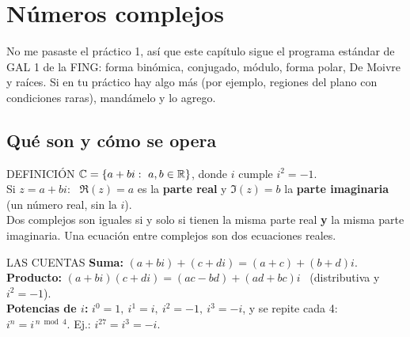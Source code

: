 \chapter{Números complejos}
\nuevo
\begin{falta}
No me pasaste el práctico 1, así que este capítulo sigue el programa estándar de GAL 1 de la FING: forma binómica, conjugado, módulo, forma polar, De Moivre y raíces. Si en tu práctico hay algo más (por ejemplo, regiones del plano con condiciones raras), mandámelo y lo agrego.
\end{falta}

\section{Qué son y cómo se opera}
\begin{sello}{DEFINICIÓN}
$\C=\{a+bi:\ a,b\in\R\}$, donde $i$ cumple $i^2=-1$.\\[2pt]
Si $z=a+bi$: \ $\Re(z)=a$ es la \textbf{parte real} y $\Im(z)=b$ la \textbf{parte imaginaria} (un número real, sin la $i$).\\[2pt]
Dos complejos son iguales si y solo si tienen la misma parte real \textbf{y} la misma parte imaginaria. Una ecuación entre complejos son dos ecuaciones reales.
\end{sello}
\begin{memo}{LAS CUENTAS}
\textbf{Suma:} $(a+bi)+(c+di)=(a+c)+(b+d)i$.\\
\textbf{Producto:} $(a+bi)(c+di)=(ac-bd)+(ad+bc)i$ \ (distributiva y $i^2=-1$).\\
\textbf{Potencias de $i$:} $i^0=1,\ i^1=i,\ i^2=-1,\ i^3=-i$, y se repite cada 4: \ $i^n=i^{\,n\bmod 4}$. Ej.: $i^{27}=i^3=-i$.
\end{memo}

